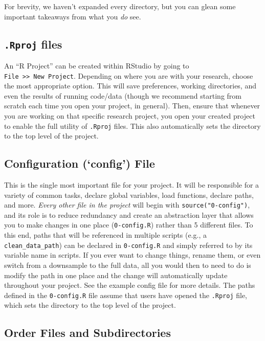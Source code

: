\documentclass[]{book}
\begin{document}
For brevity, we haven't expanded every directory, but you can glean some important takeaways from what you \emph{do} see.

\hypertarget{rproj-files}{%
\subsection{\texorpdfstring{\texttt{.Rproj} files}{.Rproj files}}\label{rproj-files}}

An ``R Project'' can be created within RStudio by going to \texttt{File\ \textgreater{}\textgreater{}\ New\ Project}. Depending on where you are with your research, choose the most appropriate option. This will save preferences, working directories, and even the results of running code/data (though we recommend starting from scratch each time you open your project, in general). Then, ensure that whenever you are working on that specific research project, you open your created project to enable the full utility of \texttt{.Rproj} files. This also automatically sets the directory to the top level of the project.

\hypertarget{configuration-config-file}{%
\subsection{Configuration (`config') File}\label{configuration-config-file}}

This is the single most important file for your project. It will be responsible for a variety of common tasks, declare global variables, load functions, declare paths, and more. \emph{Every other file in the project} will begin with \texttt{source("0-config")}, and its role is to reduce redundancy and create an abstraction layer that allows you to make changes in one place (\texttt{0-config.R}) rather than 5 different files. To this end, paths that will be referenced in multiple scripts (e.g., a \texttt{clean\_data\_path}) can be declared in \texttt{0-config.R} and simply referred to by its variable name in scripts. If you ever want to change things, rename them, or even switch from a downsample to the full data, all you would then to need to do is modify the path in one place and the change will automatically update throughout your project. See the example config file for more details. The paths defined in the \texttt{0-config.R} file assume that users have opened the \texttt{.Rproj} file, which sets the directory to the top level of the project.

\hypertarget{order-files-and-subdirectories}{%
\subsection{Order Files and Subdirectories}\label{order-files-and-subdirectories}}
\end{document}

